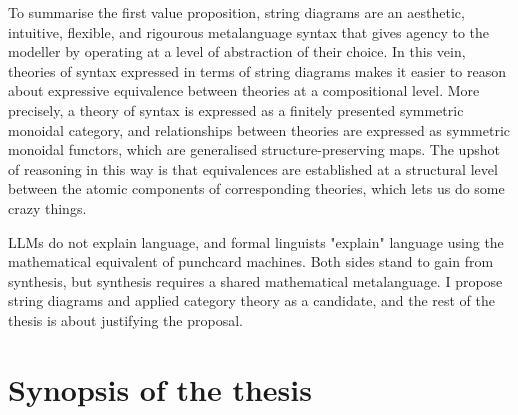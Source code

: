 To summarise the first value proposition, string diagrams are an aesthetic, intuitive, flexible, and rigourous metalanguage syntax that gives agency to the modeller by operating at a level of abstraction of their choice.  In this vein, theories of syntax expressed in terms of string diagrams makes it easier to reason about expressive equivalence between theories at a compositional level. More precisely, a theory of syntax is expressed as a finitely presented symmetric monoidal category, and relationships between theories are expressed as symmetric monoidal functors, which are generalised structure-preserving maps. The upshot of reasoning in this way is that equivalences are established at a structural level between the atomic components of corresponding theories, which lets us do some crazy things.

 LLMs do not explain language, and formal linguists "explain" language using the mathematical equivalent of punchcard machines. Both sides stand to gain from synthesis, but synthesis requires a shared mathematical metalanguage. I propose string diagrams and applied category theory as a candidate, and the rest of the thesis is about justifying the proposal.

\section{Synopsis of the thesis}

